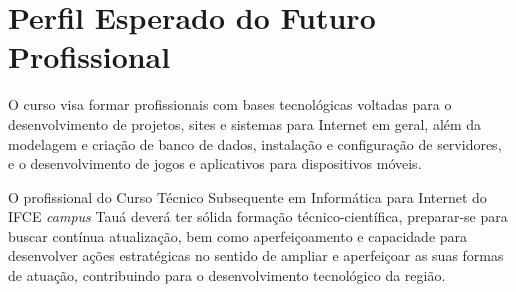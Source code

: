 \documentclass[
	12pt,				%
	openright,			%
	twoside,			%
	a4paper,			%
	chapter=TITLE,		%
	english,			%
	french,				%
	spanish,			%
	brazil,				%
	]{abntex2}
\begin{document}
\section{Perfil Esperado do Futuro Profissional}


O curso visa formar profissionais com bases tecnológicas voltadas para o desenvolvimento de projetos, sites e sistemas para Internet em geral, além da modelagem e criação de banco de dados, instalação e configuração de servidores, e o desenvolvimento de jogos e aplicativos para dispositivos móveis.

O profissional do Curso Técnico Subsequente em Informática para Internet do IFCE \textit{campus} Tauá deverá ter sólida formação técnico-científica, preparar-se para buscar contínua atualização, bem como aperfeiçoamento e capacidade para desenvolver ações estratégicas no sentido de ampliar e aperfeiçoar as suas formas de atuação, contribuindo para o desenvolvimento tecnológico da região.
\end{document}
